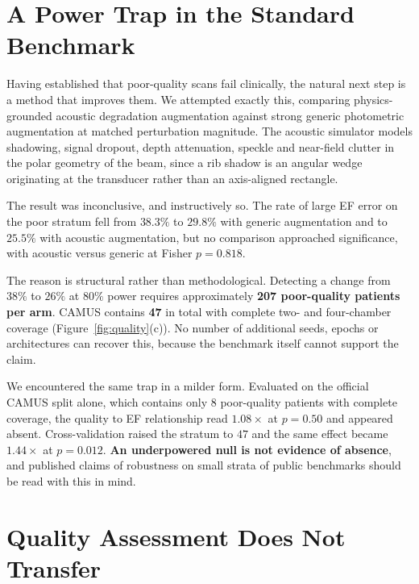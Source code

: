 \documentclass[conference,a4paper]{IEEEtran}
\begin{document}
\section{A Power Trap in the Standard Benchmark}
\label{sec:power}

Having established that poor-quality scans fail clinically, the natural next step is a
method that improves them. We attempted exactly this, comparing physics-grounded acoustic
degradation augmentation against strong generic photometric augmentation at matched
perturbation magnitude. The acoustic simulator models shadowing, signal dropout, depth
attenuation, speckle and near-field clutter in the polar geometry of the beam, since a rib
shadow is an angular wedge originating at the transducer rather than an axis-aligned
rectangle.

The result was inconclusive, and instructively so. The rate of large EF error on
the poor stratum fell from $38.3\%$ to $29.8\%$ with generic augmentation and to $25.5\%$
with acoustic augmentation, but no comparison approached significance, with acoustic versus
generic at Fisher $p = 0.818$.

The reason is structural rather than methodological. Detecting a change from $38\%$ to
$26\%$ at $80\%$ power requires approximately \textbf{207 poor-quality patients per arm}.
CAMUS contains \textbf{47} in total with complete two- and four-chamber coverage
(Figure~\ref{fig:quality}(c)). No number of additional seeds, epochs or architectures can
recover this, because the benchmark itself cannot support the claim.

We encountered the same trap in a milder form. Evaluated on the official CAMUS split alone,
which contains only $8$ poor-quality patients with complete coverage, the quality to EF
relationship read $1.08\times$ at $p = 0.50$ and appeared absent. Cross-validation raised
the stratum to $47$ and the same effect became $1.44\times$ at $p = 0.012$. \textbf{An
underpowered null is not evidence of absence}, and published claims of robustness on small
strata of public benchmarks should be read with this in mind.

\section{Quality Assessment Does Not Transfer}
\label{sec:transfer}
\end{document}
